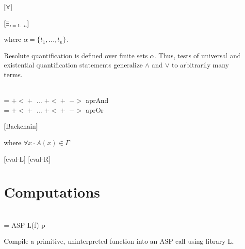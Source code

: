 \documentclass[runningheads]{llncs}
\theoremstyle{definition}
\begin{document}
\begin{definition}[Implication]
  
\end{definition}

\begin{minipage}{0.45\linewidth}
 [$\forall$]
\end{minipage}
\begin{minipage}{0.45\linewidth}
  [$\exists_{i=1\ldots n}$]
\end{minipage}

where $\alpha=\{t_1,\ldots,t_n\}$.

Resolute quantification is defined over finite sets $\alpha$. Thus,
tests of universal and existential quantification statements
generalize $\wedge$ and $\vee$ to arbitrarily many terms.

\begin{definition}\\
   =  $\mathsf{+\!<\!+}$
  $\ldots$ $\mathsf{+\!<\!+}$ $->$ aprAnd \\
   =  $\mathsf{+\!<\!+}$
  $\ldots$ $\mathsf{+\!<\!+}$ $->$ aprOr
\end{definition}

[Backchain]

where $\forall \bar{x}\cdot A(\bar{x})\in\Gamma$

\begin{definition}[Backchain]

\end{definition}

[eval-L]
[eval-R]

\begin{definition}[Eval]
  
\end{definition}

\section{Computations}

\begin{definition}\\
 = ASP L(f) p
\end{definition}

Compile a primitive, uninterpreted function into an ASP call using
library L.

%
% 
%
%
%

%

%
\end{document}
